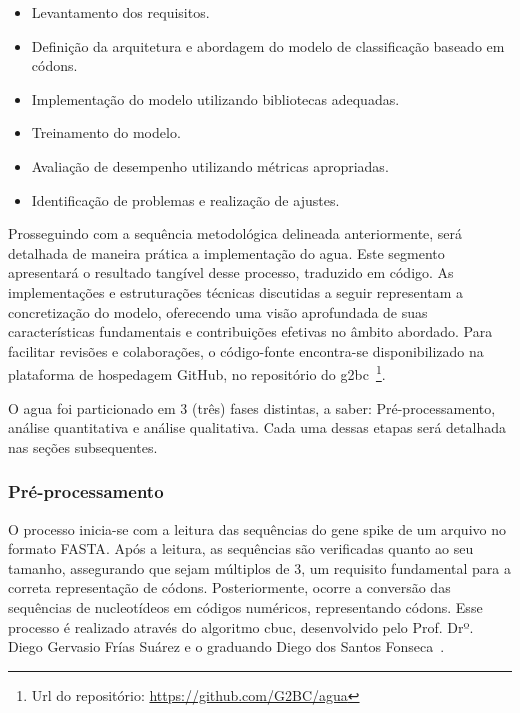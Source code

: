 \begin{itemize}
  \item Levantamento dos requisitos.
  \item Definição da arquitetura e abordagem do modelo de classificação baseado em códons.
  \item Implementação do modelo utilizando bibliotecas adequadas.
  \item Treinamento do modelo.
  \item Avaliação de desempenho utilizando métricas apropriadas.
  \item Identificação de problemas e realização de ajustes.
\end{itemize}

Prosseguindo com a sequência metodológica delineada anteriormente, será detalhada de maneira prática a implementação do \gls{agua}. Este segmento apresentará o resultado tangível desse processo, traduzido em código. As implementações e estruturações técnicas discutidas a seguir representam a concretização do modelo, oferecendo uma visão aprofundada de suas características fundamentais e contribuições efetivas no âmbito abordado. Para facilitar revisões e colaborações, o código-fonte encontra-se disponibilizado na plataforma de hospedagem GitHub, no repositório do \gls{g2bc}~\footnote{Url do repositório: \url{https://github.com/G2BC/agua}}.

O \gls{agua} foi particionado em 3 (três) fases distintas, a saber: Pré-processamento, análise quantitativa e análise qualitativa. Cada uma dessas etapas será detalhada nas seções subsequentes.

\subsubsection{Pré-processamento}

O processo inicia-se com a leitura das sequências do gene spike de um arquivo no formato {FASTA}. Após a leitura, as sequências são verificadas quanto ao seu tamanho, assegurando que sejam múltiplos de 3, um requisito fundamental para a correta representação de códons. Posteriormente, ocorre a conversão das sequências de nucleotídeos em códigos numéricos, representando códons. Esse processo é realizado através do algoritmo \gls{cbuc}, desenvolvido pelo {Prof.} Drº. Diego Gervasio Frías Suárez e o graduando Diego dos Santos Fonseca~\cite{identificacao_cbuc_diego_2021}.

